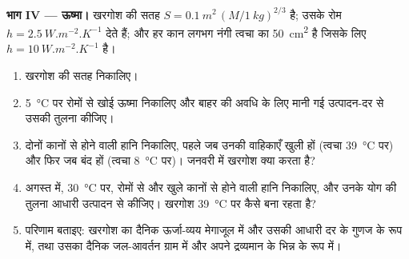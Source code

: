 \begin{problem}
\medskip
\noindent\textbf{भाग IV --- ऊष्मा।}
खरगोश की सतह $S = \qty{0.1}{m^2}\,(M/\qty{1}{kg})^{2/3}$ है; उसके रोम
$h = \qty{2.5}{W.m^{-2}.K^{-1}}$ देते हैं; और हर कान लगभग नंगी त्वचा का
\qty{50}{cm^2} है जिसके लिए $h = \qty{10}{W.m^{-2}.K^{-1}}$ है।
\begin{enumerate}[resume]
  \item खरगोश की सतह निकालिए।
  \item \qty{5}{\celsius} पर रोमों से खोई ऊष्मा निकालिए और बाहर की
        अवधि के लिए मानी गई उत्पादन-दर से उसकी तुलना कीजिए।
  \item दोनों कानों से होने वाली हानि निकालिए, पहले जब उनकी वाहिकाएँ
        खुली हों (त्वचा \qty{39}{\celsius} पर) और फिर जब बंद हों (त्वचा
        \qty{8}{\celsius} पर)। जनवरी में खरगोश क्या करता है?
  \item अगस्त में, \qty{30}{\celsius} पर, रोमों से और खुले कानों से
        होने वाली हानि निकालिए, और उनके योग की तुलना आधारी उत्पादन से
        कीजिए। खरगोश \qty{39}{\celsius} पर कैसे बना रहता है?
  \item परिणाम बताइए: खरगोश का दैनिक ऊर्जा-व्यय मेगाजूल में और उसकी
        आधारी दर के गुणज के रूप में, तथा उसका दैनिक जल-आवर्तन ग्राम में
        और अपने द्रव्यमान के भिन्न के रूप में।
\end{enumerate}
\end{problem}
